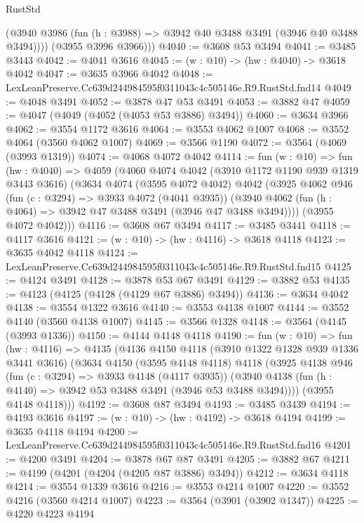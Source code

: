\begin{lexlean}{RustStd}
\begin{coremodule}
          (@3940 @3986 (fun (h : @3988) => @3942 @40 @3488 @3491 (@3946 @40 @3488 @3494))))
        (@3955 @3996 @3966)))
@4040 := @3608 @53 @3494
@4041 := @3485 @3443
@4042 := @4041 @3616
@4045 := (w : @10) -> (hw : @4040) -> @3618 @4042
@4047 := @3635 @3966 @4042
@4048 := LexLeanPreserve.Cc639d244984595f0311043c4c505146e.R9.RustStd.fnd14
@4049 := @4048 @3491
@4052 := @3878 @47 @53 @3491
@4053 := @3882 @47
@4059 := @4047 (@4049 (@4052 (@4053 @53 @3886) @3494))
@4060 := @3634 @3966
@4062 := @3554 @1172 @3616
@4064 := @3553 @4062 @1007
@4068 := @3552 @4064 (@3560 @4062 @1007)
@4069 := @3566 @1190
@4072 := @3564 (@4069 (@3993 @1319))
@4074 := @4068 @4072 @4042
@4114 := fun (w : @10) =>
  fun (hw : @4040) =>
  @4059
    (@4060
      @4074
      @4042
      (@3910 @1172 @1190 @939 @1319 @3443 @3616)
      (@3634
        @4074
        (@3595 @4072 @4042)
        @4042
        (@3925
          @4062
          @946
          (fun (c : @3294) => @3933 @4072 (@4041 @3935))
          (@3940 @4062 (fun (h : @4064) => @3942 @47 @3488 @3491 (@3946 @47 @3488 @3494))))
        (@3955 @4072 @4042)))
@4116 := @3608 @67 @3494
@4117 := @3485 @3441
@4118 := @4117 @3616
@4121 := (w : @10) -> (hw : @4116) -> @3618 @4118
@4123 := @3635 @4042 @4118
@4124 := LexLeanPreserve.Cc639d244984595f0311043c4c505146e.R9.RustStd.fnd15
@4125 := @4124 @3491
@4128 := @3878 @53 @67 @3491
@4129 := @3882 @53
@4135 := @4123 (@4125 (@4128 (@4129 @67 @3886) @3494))
@4136 := @3634 @4042
@4138 := @3554 @1322 @3616
@4140 := @3553 @4138 @1007
@4144 := @3552 @4140 (@3560 @4138 @1007)
@4145 := @3566 @1328
@4148 := @3564 (@4145 (@3993 @1336))
@4150 := @4144 @4148 @4118
@4190 := fun (w : @10) =>
  fun (hw : @4116) =>
  @4135
    (@4136
      @4150
      @4118
      (@3910 @1322 @1328 @939 @1336 @3441 @3616)
      (@3634
        @4150
        (@3595 @4148 @4118)
        @4118
        (@3925
          @4138
          @946
          (fun (c : @3294) => @3933 @4148 (@4117 @3935))
          (@3940 @4138 (fun (h : @4140) => @3942 @53 @3488 @3491 (@3946 @53 @3488 @3494))))
        (@3955 @4148 @4118)))
@4192 := @3608 @87 @3494
@4193 := @3485 @3439
@4194 := @4193 @3616
@4197 := (w : @10) -> (hw : @4192) -> @3618 @4194
@4199 := @3635 @4118 @4194
@4200 := LexLeanPreserve.Cc639d244984595f0311043c4c505146e.R9.RustStd.fnd16
@4201 := @4200 @3491
@4204 := @3878 @67 @87 @3491
@4205 := @3882 @67
@4211 := @4199 (@4201 (@4204 (@4205 @87 @3886) @3494))
@4212 := @3634 @4118
@4214 := @3554 @1339 @3616
@4216 := @3553 @4214 @1007
@4220 := @3552 @4216 (@3560 @4214 @1007)
@4223 := @3564 (@3901 (@3902 @1347))
@4225 := @4220 @4223 @4194

\end{coremodule}
\end{lexlean}
